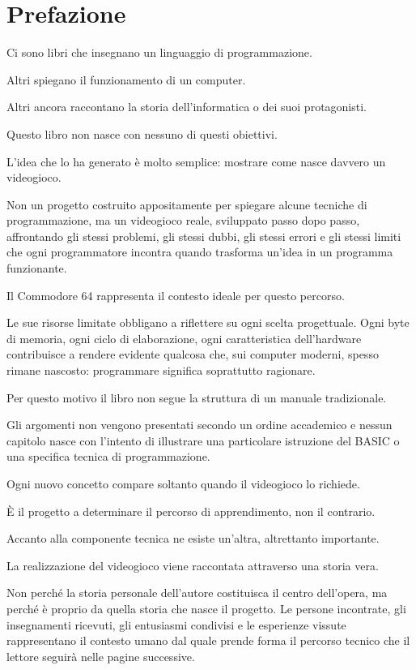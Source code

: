 \documentclass{article}
\author{HP}
\date{2026-07-26}
\begin{document}
\section{Prefazione}
Ci sono libri che insegnano un linguaggio di programmazione.

Altri spiegano il funzionamento di un computer.

Altri ancora raccontano la storia dell'informatica o dei suoi protagonisti.

Questo libro non nasce con nessuno di questi obiettivi.

L'idea che lo ha generato è molto semplice: mostrare come nasce davvero un videogioco.

Non un progetto costruito appositamente per spiegare alcune tecniche di programmazione, ma un videogioco reale,
sviluppato passo dopo passo, affrontando gli stessi problemi, gli stessi dubbi, gli stessi errori e gli stessi limiti
che ogni programmatore incontra quando trasforma un'idea in un programma funzionante.

Il Commodore 64 rappresenta il contesto ideale per questo percorso.

Le sue risorse limitate obbligano a riflettere su ogni scelta progettuale. Ogni byte di memoria, ogni ciclo di
elaborazione, ogni caratteristica dell'hardware contribuisce a rendere evidente qualcosa che, sui computer moderni,
spesso rimane nascosto: programmare significa soprattutto ragionare.

Per questo motivo il libro non segue la struttura di un manuale tradizionale.

Gli argomenti non vengono presentati secondo un ordine accademico e nessun capitolo nasce con l'intento di illustrare
una particolare istruzione del BASIC o una specifica tecnica di programmazione.

Ogni nuovo concetto compare soltanto quando il videogioco lo richiede.

È il progetto a determinare il percorso di apprendimento, non il contrario.

Accanto alla componente tecnica ne esiste un'altra, altrettanto importante.

La realizzazione del videogioco viene raccontata attraverso una storia vera.

Non perché la storia personale dell'autore costituisca il centro dell'opera, ma perché è proprio da quella storia che
nasce il progetto. Le persone incontrate, gli insegnamenti ricevuti, gli entusiasmi condivisi e le esperienze vissute
rappresentano il contesto umano dal quale prende forma il percorso tecnico che il lettore seguirà nelle pagine
successive.
\end{document}
